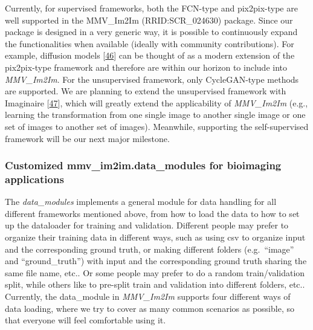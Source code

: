 Currently, for supervised frameworks, both the FCN-type and pix2pix-type are well supported in the MMV\_Im2Im (RRID:SCR\_024630) package. Since our package is designed in a very generic way, it is possible to continuously expand the functionalities when available (ideally with community contributions). For example, diffusion models {[}\protect\hyperlink{ref-1A3yurr7m}{46}{]} can be thought of as a modern extension of the pix2pix-type framework and therefore are within our horizon to include into \emph{MMV\_Im2Im}. For the unsupervised framework, only CycleGAN-type methods are supported. We are planning to extend the unsupervised framework with Imaginaire {[}\protect\hyperlink{ref-vzOBQiEH}{47}{]}, which will greatly extend the applicability of \emph{MMV\_Im2Im} (e.g., learning the transformation from one single image to another single image or one set of images to another set of images). Meanwhile, supporting the self-supervised framework will be our next major milestone.

\hypertarget{customized-mmv_im2im.data_modules-for-bioimaging-applications}{%
\subsubsection{Customized mmv\_im2im.data\_modules for bioimaging applications}\label{customized-mmv_im2im.data_modules-for-bioimaging-applications}}

The \emph{data\_modules} implements a general module for data handling for all different frameworks mentioned above, from how to load the data to how to set up the dataloader for training and validation. Different people may prefer to organize their training data in different ways, such as using csv to organize input and the corresponding ground truth, or making different folders (e.g.~``image'' and ``ground\_truth'') with input and the corresponding ground truth sharing the same file name, etc.. Or some people may prefer to do a random train/validation split, while others like to pre-split train and validation into different folders, etc.. Currently, the data\_module in \emph{MMV\_Im2Im} supports four different ways of data loading, where we try to cover as many common scenarios as possible, so that everyone will feel comfortable using it.

